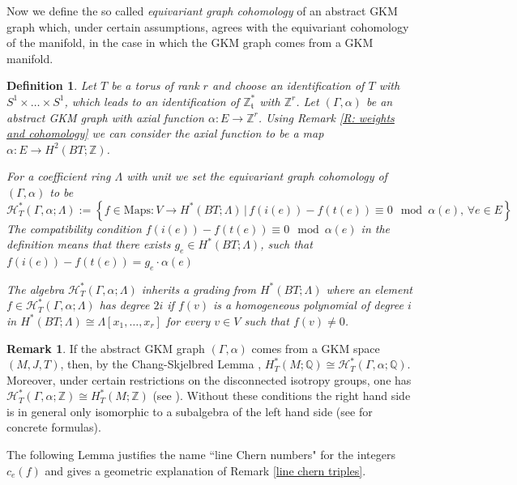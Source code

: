\documentclass[12pt,a4paper]{amsart}
\newcommand{\ZZ}{\mathbb{Z}}
\newcommand{\QQ}{\mathbb{Q}}
\theoremstyle{plain}
\newtheorem{defn}[thm]{Definition}
\theoremstyle{definition}
\newtheorem{rem}[thm]{Remark}
\begin{document}
Now we define the so called \emph{equivariant graph cohomology}
of an abstract GKM graph which, under certain assumptions, agrees with the
equivariant cohomology of the manifold, in the case in which the GKM graph
comes from a GKM manifold. 
 
\begin{defn}\label{D: graph cohomology}
Let $T$ be a torus of rank $r$ and choose an identification of $T$ with $S^{1} \times
\ldots \times S^{1}$, which leads to an identification of $\mathbb{Z}_{\mathfrak t}^{\ast}$ with $\mathbb{Z}^{r}$. Let $(\Gamma, \alpha)$ be an abstract GKM graph with axial function
$\alpha \colon E \to \mathbb{Z}^{r}$.  Using Remark \ref{R: weights and
cohomology} we can consider the axial function to be a map $\alpha \colon E \to
H^{2}(BT;\mathbb{Z})$.

For a coefficient ring $\Lambda$ with unit we set
the \emph{equivariant graph cohomology} of $(\Gamma, \alpha)$ to be
\[
	\mathcal{H}_{T}^{\ast}(\Gamma, \alpha; \Lambda) := \left\{ f\in \text{Maps}\colon V \to 
	H^{\ast}(BT;\Lambda) \, | \, f(i(e)) - f(t(e)) \equiv 0 \mod \alpha(e),\, \forall e \in
E \right\} 
\]
The compatibility condition $f(i(e)) - f(t(e)) \equiv 0 \mod \alpha(e)$ in the definition means that there exists $g_e\in H^{\ast}(BT;\Lambda)$,
such that $f(i(e)) - f(t(e))=g_e\cdot \alpha(e)$

The algebra $\mathcal{H}_{T}^{\ast}(\Gamma, \alpha; \Lambda)$ inherits a grading from
$H^*(BT;\Lambda)$ where an element $f \in \mathcal{H}_{T}^{\ast}(\Gamma, \alpha; \Lambda)$
has degree $2i$ if $f(v)$ is a homogeneous polynomial of degree $i$
in $H^{\ast}(BT; \Lambda) \cong \Lambda[x_{1},\ldots,x_{r}]$ for every $v \in V$ such that
$f(v) \neq 0$.
\end{defn}

\begin{rem}
If the abstract GKM graph $(\Gamma,\alpha)$ comes from a GKM space $(M,J,T)$, then,
by the Chang-Skjelbred Lemma \cite{MR375357}, $H_T^*(M;\QQ)\cong \mathcal{H}_{T}^{\ast}(\Gamma, \alpha; \QQ)$. 
Moreover, under certain restrictions on the disconnected isotropy groups, one has
$\mathcal{H}_T^*(\Gamma,\alpha;\ZZ) \cong H_T^*(M;\ZZ)$ (see \cite{MR2308029}). Without these
conditions the right hand side is in general only isomorphic to a subalgebra of the left
hand side (see \cite{zoller2024integralchangskjelbredcomputationsdisconnected} for concrete formulas). 
\end{rem}

The following Lemma justifies the name ``line Chern numbers" for the integers 
$c_e(f)$ and gives a geometric explanation of Remark \ref{line chern triples}.
\end{document}
